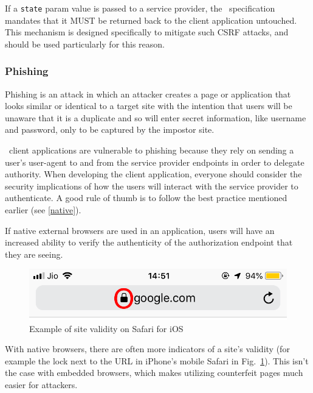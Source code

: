 If a \texttt{state} param value is passed to a service provider, the \oauth\ specification mandates that it MUST be returned back to the client application untouched. This mechanism is designed specifically to mitigate such CSRF attacks, and should be used particularly for this reason.

\subsubsection{Phishing}
Phishing is an attack in which an attacker creates a page or application that looks similar or identical to a target site with the intention that users will be unaware that it is a duplicate and so will enter secret information, like username and password, only to be captured by the impostor site.

\oauth\ client applications are vulnerable to phishing because they rely on sending a user's user-agent to and from the service provider endpoints in order to delegate authority. When developing the client application, everyone should consider the security implications of how the users will interact with the service provider to authenticate. A good rule of thumb is to follow the best practice mentioned earlier (see \ref{native}).

If native external browsers are used in an application, users will have an increased ability to verify the authenticity of the authorization endpoint that they are seeing.

\vspace{1cm}

\begin{figure}[ht]
    \centering
    \includegraphics[scale=0.55]{chapters/images/chp4/oie_toIlpPOFRMdK.png}
    \caption{Example of site validity on Safari for iOS}
    \label{fig:ioslock}
\end{figure}

\vspace{0.5cm}

With native browsers, there are often more indicators of a site's validity (for example the lock next to the URL in iPhone's mobile Safari in Fig.~\ref{fig:ioslock}). This isn't the case with embedded browsers, which makes utilizing counterfeit pages much easier for attackers.

